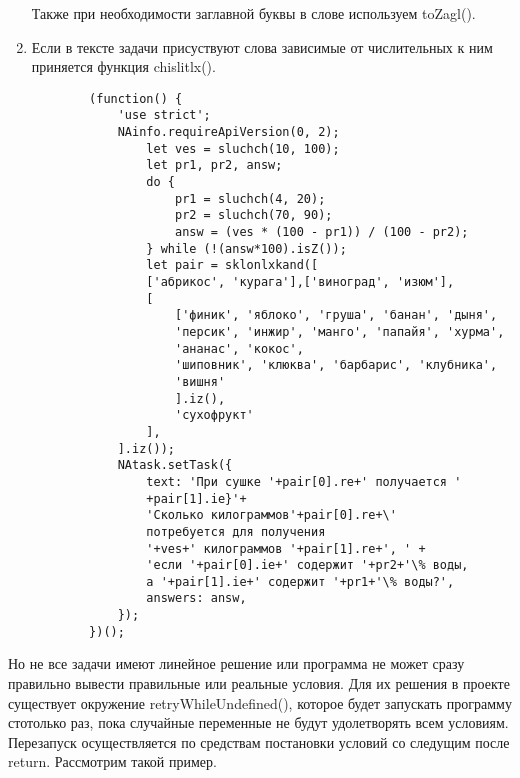 \begin{enumerate}
          Также при необходимости заглавной буквы в слове используем toZagl().
    \item Если в тексте задачи присуствуют слова зависимые от числительных к ним приняется функция chislitlx().
          \begin{verbatim}
        (function() {
            'use strict';
            NAinfo.requireApiVersion(0, 2);
                let ves = sluchch(10, 100);
                let pr1, pr2, answ;
                do {
                    pr1 = sluchch(4, 20);
                    pr2 = sluchch(70, 90);
                    answ = (ves * (100 - pr1)) / (100 - pr2);
                } while (!(answ*100).isZ());
                let pair = sklonlxkand([
                ['абрикос', 'курага'],['виноград', 'изюм'],
                [
                    ['финик', 'яблоко', 'груша', 'банан', 'дыня',
                    'персик', 'инжир', 'манго', 'папайя', 'хурма',
                    'ананас', 'кокос',
                    'шиповник', 'клюква', 'барбарис', 'клубника',
                    'вишня'
                    ].iz(),
                    'сухофрукт'
                ],
            ].iz());
            NAtask.setTask({
                text: 'При сушке '+pair[0].re+' получается '
                +pair[1].ie}'+
                'Сколько килограммов'+pair[0].re+\'
                потребуется для получения 
                '+ves+' килограммов '+pair[1].re+', ' +
                'если '+pair[0].ie+' содержит '+pr2+'\% воды, 
                а '+pair[1].ie+' содержит '+pr1+'\% воды?',
                answers: answ,
            });
        })();
        \end{verbatim}
\end{enumerate}
Но не все задачи имеют линейное решение или программа не может сразу правильно вывести правильные или реальные условия.
Для их решения в проекте существует окружение retryWhileUndefined(), которое будет запускать программу стотолько раз, пока случайные переменные не будут удолетворять всем условиям.
Перезапуск осуществляется по средствам постановки условий со следущим после return.
Рассмотрим такой пример.

